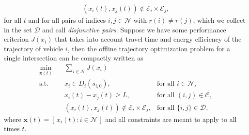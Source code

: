 \documentclass{article}
\theoremstyle{definition}
\theoremstyle{plain}
\begin{document}
\begin{align*}
  (x_{i}(t), x_{j}(t)) \notin \mathcal{E}_{i} \times \mathcal{E}_{j} ,
\end{align*}
for all $t$ and for all pairs of indices $i, j \in \mathcal{N}$ with
$r(i) \neq r(j)$, which we collect in the set $\mathcal{D}$ and call \textit{disjunctive
  pairs}.
%
Suppose we have some performance criterion $J(x_{i})$ that takes into account
travel time and energy efficiency of the trajectory of vehicle $i$, then the
offline trajectory optimization problem for a single intersection can be
compactly written as
\begin{equation}
\label{eq:offline_single_intersection}
\begin{aligned}
  \min_{\mathbf{x}(t)} \quad & \sum_{i \in \mathcal{N}} J(x_{i}) \\
  \text{s.t.} \quad  & x_{i} \in D_{i}(s_{i,0}) , &\text{for all } i \in \mathcal{N} , \\
                & x_{i}(t) - x_{j}(t) \geq L, &\text{for all } (i,j) \in \mathcal{C} , \\
                & (x_{i}(t), x_{j}(t))  \notin \mathcal{E}_{i} \times \mathcal{E}_{j} , &\text{for all } \{i,j\} \in \mathcal{D} ,
\end{aligned}
\end{equation}
where $\mathbf{x}(t) = [\, x_{i}(t) : i \in \mathcal{N} \,]$ and all constraints
are meant to apply to all times $t$.
\end{document}
